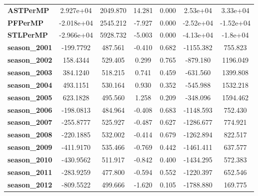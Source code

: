 \begin{center}
\begin{tabular}{lcccccc}
\textbf{ASTPerMP}             &    2.927e+04  &     2049.870     &    14.281  &         0.000        &     2.53e+04    &     3.33e+04     \\
\textbf{PFPerMP}              &   -2.018e+04  &     2545.212     &    -7.927  &         0.000        &    -2.52e+04    &    -1.52e+04     \\
\textbf{STLPerMP}             &   -2.966e+04  &     5928.732     &    -5.003  &         0.000        &    -4.13e+04    &     -1.8e+04     \\
\textbf{season\_2001}         &    -199.7792  &      487.561     &    -0.410  &         0.682        &    -1155.382    &      755.823     \\
\textbf{season\_2002}         &     158.4344  &      529.405     &     0.299  &         0.765        &     -879.180    &     1196.049     \\
\textbf{season\_2003}         &     384.1240  &      518.215     &     0.741  &         0.459        &     -631.560    &     1399.808     \\
\textbf{season\_2004}         &     493.1151  &      530.164     &     0.930  &         0.352        &     -545.988    &     1532.218     \\
\textbf{season\_2005}         &     623.1828  &      495.560     &     1.258  &         0.209        &     -348.096    &     1594.462     \\
\textbf{season\_2006}         &    -198.0813  &      484.964     &    -0.408  &         0.683        &    -1148.593    &      752.430     \\
\textbf{season\_2007}         &    -255.8777  &      525.927     &    -0.487  &         0.627        &    -1286.677    &      774.921     \\
\textbf{season\_2008}         &    -220.1885  &      532.002     &    -0.414  &         0.679        &    -1262.894    &      822.517     \\
\textbf{season\_2009}         &    -411.9170  &      535.466     &    -0.769  &         0.442        &    -1461.411    &      637.577     \\
\textbf{season\_2010}         &    -430.9562  &      511.917     &    -0.842  &         0.400        &    -1434.295    &      572.383     \\
\textbf{season\_2011}         &    -283.9259  &      477.800     &    -0.594  &         0.552        &    -1220.397    &      652.546     \\
\textbf{season\_2012}         &    -809.5522  &      499.666     &    -1.620  &         0.105        &    -1788.880    &      169.775     \\

\end{tabular}
\end{center}
